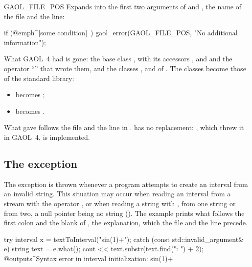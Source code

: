 \begin{defmacro}{GAOL\_FILE\_POS}
Expands into the first two arguments of  and
, the name of the file and the line:

\begin{example}
if (@emph^[some condition]~) {
  gaol_error(GAOL_FILE_POS, "No additional information");
}
\end{example}
\end{defmacro}

\begin{Rem}
What GAOL~4 had is gone: the base class , with its
accessors ,  and  and the
operator ``\code{<{}<}'' that wrote them, and the classes
,  and
 of . The
classes become those of the standard library:
\begin{itemize}
\item {} becomes
  ;
\item {} becomes
  .
\end{itemize}
\noindent
What  gave follows the file and the line in
.  has no replacement: , which threw it in GAOL~4, is implemented.\newinvfive
\end{Rem}

\subsection{The  exception}%
\label{sec:invalid_argument}

The exception  is thrown whenever a program
attempts to create an interval from an invalid string. This situation may
occur when reading an interval from a stream with the operator \code{>{}>},
or when reading a string with , from one string
or from two, a null pointer being no string ().
The example prints what follows the first colon and the blank of
, the explanation, which the file and the line precede.

\begin{example}
try {
  interval x = textToInterval("sin(1)+");
} catch (const std::invalid_argument& e) {
  string text = e.what();
  cout << text.substr(text.find(": ") + 2);
}
@outputs^Syntax error in interval initialization: sin(1)+~
\end{example}

